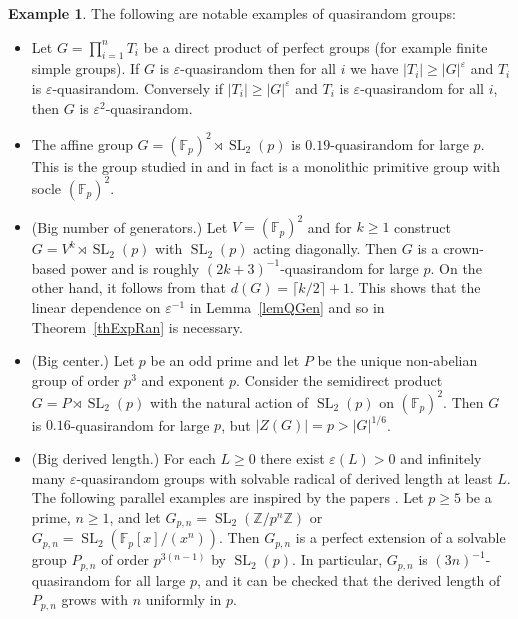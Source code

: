 \documentclass[11pt,reqno]{amsart}
\numberwithin{equation}{section}
\theoremstyle{definition}
\newtheorem{example}[theorem]{Example}
\theoremstyle{remark}
\newcommand{\SL}{\mathop{\mathrm{SL}}}
\begin{document}
\begin{example} \label{exQ}
The following are notable examples of quasirandom groups:
\begin{itemize}
\item[(a)] Let $G = \prod_{i=1}^n T_i$ be a direct product of perfect groups (for example finite simple groups).
	If $G$ is $\varepsilon$-quasirandom then for all $i$ we have $|T_i| \geq |G|^\varepsilon$ and
	$T_i$ is $\varepsilon$-quasirandom.
	Conversely if $|T_i| \geq |G|^\varepsilon$ and $T_i$ is $\varepsilon$-quasirandom for all $i$,
	then $G$ is $\varepsilon^2$-quasirandom.

\item[(b)] The affine group $G= (\mathbb{F}_p)^2 \rtimes \SL_2(p)$ is $0.19$-quasirandom for large $p$.
This is the group studied in \cite{LV16}
and in fact is a monolithic primitive group with socle $(\mathbb{F}_p)^2$.

\item[(c)] (Big number of generators.)
Let $V=(\mathbb{F}_p)^2$ and for $k \geq 1$ construct $G = V^k \rtimes \SL_2(p)$ with $\SL_2(p)$ acting diagonally.
Then $G$ is a crown-based power and is roughly $(2k+3)^{-1}$-quasirandom for large $p$.
On the other hand, it follows from \cite[Theorem~2.1]{DLRD15} that $d(G) = \lceil k/2 \rceil +1$.
This shows that the linear dependence on $\varepsilon^{-1}$
in Lemma~\ref{lemQGen} and so in Theorem~\ref{thExpRan} is necessary.

\item[(d)] (Big center.)
Let $p$ be an odd prime and let $P$ be the unique non-abelian group of order $p^3$ and exponent $p$.
Consider the semidirect product $G = P \rtimes \SL_2(p)$ with the natural action of $\SL_2(p)$ on $(\mathbb{F}_p)^2$.
Then $G$ is $0.16$-quasirandom for large $p$, but $|Z(G)| = p > |G|^{1/6}$.

\item[(e)] (Big derived length.)
	For each $L \geq 0$ there exist $\varepsilon(L) >0$ and
	infinitely many $\varepsilon$-quasirandom groups with solvable radical of derived length at least $L$.
	The following parallel examples are inspired by the papers \cite{BV12,Bra16}.
	Let $p \geq 5$ be a prime, $n \geq 1$,
	and let $G_{p,n} = \SL_2(\mathbb{Z}/p^n \mathbb{Z})$ or $G_{p,n} = \SL_2(\mathbb{F}_p[x]/(x^n))$.
	Then $G_{p,n}$ is a perfect extension of a solvable group $P_{p,n}$ of order $p^{3(n-1)}$ by $\SL_2(p)$.
	In particular, $G_{p,n}$ is $(3n)^{-1}$-quasirandom for all large $p$,
	and it can be checked that the derived length of $P_{p,n}$ grows with $n$ uniformly in $p$.


\end{itemize}
\end{example}
\end{document}
